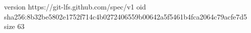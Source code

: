 version https://git-lfs.github.com/spec/v1
oid sha256:8b32be5802e1752f714c4b0272406559b00642a5f5461b4fca2064c79acfe7d5
size 63
